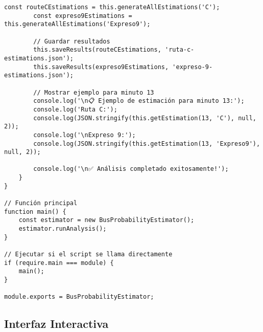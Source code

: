 \documentclass[12pt,a4paper]{article}
\begin{document}
\begin{lstlisting}[caption=bus-probability-estimator.js completo]
        const routeCEstimations = this.generateAllEstimations('C');
        const expreso9Estimations = this.generateAllEstimations('Expreso9');

        // Guardar resultados
        this.saveResults(routeCEstimations, 'ruta-c-estimations.json');
        this.saveResults(expreso9Estimations, 'expreso-9-estimations.json');

        // Mostrar ejemplo para minuto 13
        console.log('\n📋 Ejemplo de estimación para minuto 13:');
        console.log('Ruta C:');
        console.log(JSON.stringify(this.getEstimation(13, 'C'), null, 2));
        console.log('\nExpreso 9:');
        console.log(JSON.stringify(this.getEstimation(13, 'Expreso9'), null, 2));

        console.log('\n✅ Análisis completado exitosamente!');
    }
}

// Función principal
function main() {
    const estimator = new BusProbabilityEstimator();
    estimator.runAnalysis();
}

// Ejecutar si el script se llama directamente
if (require.main === module) {
    main();
}

module.exports = BusProbabilityEstimator;
\end{lstlisting}

\subsection{Interfaz Interactiva}
\end{document}
